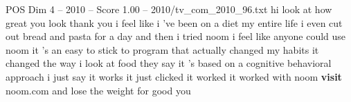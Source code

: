 \begin{textsample}{POS Dim 4 – 2010 – Score 1.00 – 2010/tv\_com\_2010\_96.txt}  \label{ex:f4_pos_058}
hi look at how great you look thank you i feel like i 've been on a diet my entire life i even cut out bread and pasta for a day and then i tried noom i feel like anyone could use noom it 's an easy to stick to program that actually changed my habits it changed the way i look at food they say it 's based on a cognitive behavioral approach i just say it works it just clicked it worked it worked with noom \textbf{visit} noom.com and lose the weight for good you

\end{textsample}
